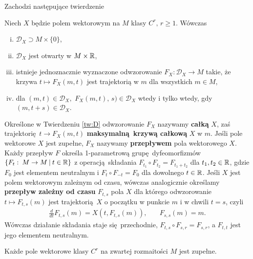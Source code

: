 Zachodzi następujące twierdzenie

\begin{twierdzenie}\label{tw:D}
Niech \(X\) będzie polem wektorowym na \(M\) klasy \(C^r,\, r\geq1\). Wówczas
\begin{enumerate}[i)]
\item \(\mathcal{D}_X\supset M\times \{0\}\),
\item \(\mathcal{D}_X\) jest otwarty w \(M\times \mathbb{R}\),
\item istnieje jednoznacznie wyznaczone odwzorowanie \(F_X:\mathcal{D}_X\rightarrow M\) takie, że krzywa \(t\mapsto F_X(m,t)\) jest trajektorią w \(m\) dla wszystkich \(m\in M\),
\item dla \((m,t)\in \mathcal{D}_X,\) \(F_X(m,t),\, s)\in\mathcal{D}_X\) wtedy i tylko wtedy, gdy \((m, t+s)\in \mathcal{D}_X\).
\end{enumerate}
\end{twierdzenie}  

Określone w Twierdzeniu \ref{tw:D} odwzorowanie \(F_X\) nazywamy \textbf{całką} \(X\), zaś trajektorię \(t\rightarrow F_X(m,t)\) \textbf{maksymalną krzywą całkową} \(X\) w \(m\). Jeśli pole wektorowe \(X\) jest zupełne, \(F_X\) nazywamy \textbf{przepływem} pola wektorowego \(X\). Każdy przepływ \(F\) określa 1-parametrową grupę dyfeomorfizmów \(\{F_t:\:M\rightarrow M\:|\: t\in \mathbb{R}\}\) z operacją składania \(F_{t_1}\circ F_{t_2} = F_{t_1 + t_2}\) dla \(t_{1}, {t}_2 \in \mathbb{R}\), gdzie \(F_0\) jest elementem neutralnym i \(F_{t}\circ F_{-t} = F_{0}\) dla dowolnego \(t\in\mathbb{R}\). Jeśli \(X\) jest polem wektorowym zależnym od czasu, wówczas analogicznie określamy \textbf{przepływ zależny od czasu} \(F_{t,s}\) pola \(X\) dla którego odwzorowanie \(t\mapsto F_{t,s}(m)\) jest trajektorią \(X\) o początku w punkcie \(m\) i w chwili \(t=s\), czyli
\begin{align}
\frac{d}{dt}F_{t,s}(m) = X\left(t, F_{t,s}(m)\right), &\quad F_{s,s}(m) = m.
\end{align} 
Wówczas działanie składania staje się przechodnie, \(F_{t,s}\circ F_{s,r} = F_{s, r}\), a \(F_{t, t}\) jest jego elementem neutralnym. 
\begin{twierdzenie}
Każde pole wektorowe klasy \(C^r\) na zwartej rozmaitości \(M\) jest zupełne.
\end{twierdzenie}


